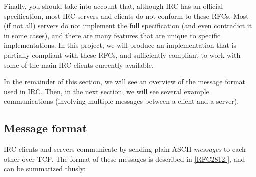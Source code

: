 \documentclass[10pt]{article}
\newcommand{\RFCsection}[2]{\href{http://tools.ietf.org/html/rfc#1\#section-#2}{[RFC#1 \textsection #2]}}
\begin{document}
Finally, you should take into account that, although IRC has an official specification, most IRC servers and clients do not conform to these RFCs. Most (if not all) servers do not implement the full specification (and even contradict it in some cases), and there are many features that are unique to specific implementations. In this project, we will produce an implementation that is partially compliant with these RFCs, and sufficiently compliant to work with some of the main IRC clients currently available.

In the remainder of this section, we will see an overview of the message format used in IRC. Then, in the next section, we will see several example communications (involving multiple messages between a client and a server).

\subsection{Message format}

IRC clients and servers communicate by sending plain ASCII \emph{messages} to each other over TCP. The format of these messages is described in \RFCsection{2812}{2.3}, and can be summarized thusly:
\end{document}

